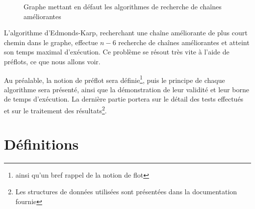 \begin{figure}[h!]
	\begin{center}
	\end{center}
	\caption{Graphe mettant en défaut les algorithmes de recherche de chaînes améliorantes}
	\label{graphe_defaut}
\end{figure}

L'algorithme d'Edmonds-Karp, recherchant une chaîne améliorante de plus court chemin dans le graphe,
effectue $n-6$ recherche de chaînes améliorantes et atteint son temps maximal d'exécution. Ce
problème se résout très vite à l'aide de préflots, ce que nous allons voir.

Au préalable, la notion de préflot sera définie\footnote{ainsi qu'un bref rappel de la notion de
flot}, puis le principe de chaque algorithme sera présenté, ainsi que la démonstration de leur
validité et leur borne de temps d'exécution. La dernière partie portera sur le détail des tests
effectués et sur le traitement des résultats\footnote{Les structures de données utilisées sont
présentées dans la documentation fournie}.

\section{Définitions}

